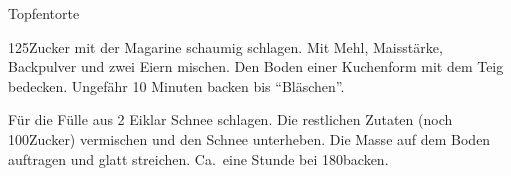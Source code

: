 \begin{recipe}[\vegetarian]{Topfentorte}

    \begin{ingredients}
    \end{ingredients}

    \begin{instructions}
        125\gram Zucker mit der Magarine schaumig schlagen.
        Mit Mehl, Maisstärke, Backpulver und zwei Eiern mischen.
        Den Boden einer Kuchenform mit dem Teig bedecken.
        Ungefähr 10 Minuten backen bis \enquote{Bläschen}.

        Für die Fülle aus 2 Eiklar Schnee schlagen.
        Die restlichen Zutaten (noch 100\gram Zucker) vermischen und den Schnee unterheben.
        Die Masse auf dem Boden auftragen und glatt streichen.
        Ca.\ eine Stunde bei 180\degC backen.
    \end{instructions}
\end{recipe}
